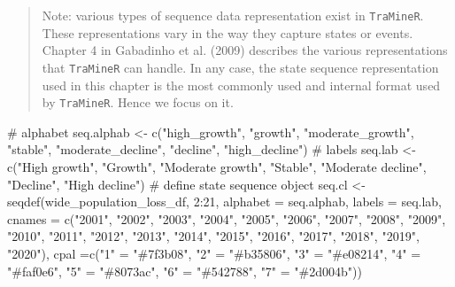 \documentclass[
  letterpaper,
  DIV=11,
  numbers=noendperiod]{scrreprt}
\newenvironment{Shaded}{\begin{snugshade}}{\end{snugshade}}
\newcommand{\AttributeTok}[1]{\textcolor[rgb]{0.40,0.45,0.13}{#1}}
\newcommand{\CommentTok}[1]{\textcolor[rgb]{0.37,0.37,0.37}{#1}}
\newcommand{\DecValTok}[1]{\textcolor[rgb]{0.68,0.00,0.00}{#1}}
\newcommand{\FunctionTok}[1]{\textcolor[rgb]{0.28,0.35,0.67}{#1}}
\newcommand{\NormalTok}[1]{\textcolor[rgb]{0.00,0.23,0.31}{#1}}
\newcommand{\OtherTok}[1]{\textcolor[rgb]{0.00,0.23,0.31}{#1}}
\newcommand{\SpecialCharTok}[1]{\textcolor[rgb]{0.37,0.37,0.37}{#1}}
\newcommand{\StringTok}[1]{\textcolor[rgb]{0.13,0.47,0.30}{#1}}
\begin{document}
\begin{quote}
Note: various types of sequence data representation exist in
\texttt{TraMineR}. These representations vary in the way they capture
states or events. Chapter 4 in Gabadinho et al. (2009) describes the
various representations that \texttt{TraMineR} can handle. In any case,
the state sequence representation used in this chapter is the most
commonly used and internal format used by \texttt{TraMineR}. Hence we
focus on it.
\end{quote}

\begin{Shaded}
\begin{Highlighting}[]
\CommentTok{\# alphabet}
\NormalTok{seq.alphab }\OtherTok{\textless{}{-}} \FunctionTok{c}\NormalTok{(}\StringTok{"high\_growth"}\NormalTok{, }\StringTok{"growth"}\NormalTok{, }\StringTok{"moderate\_growth"}\NormalTok{, }\StringTok{"stable"}\NormalTok{, }\StringTok{"moderate\_decline"}\NormalTok{, }\StringTok{"decline"}\NormalTok{, }\StringTok{"high\_decline"}\NormalTok{)}
\CommentTok{\# labels}
\NormalTok{seq.lab }\OtherTok{\textless{}{-}} \FunctionTok{c}\NormalTok{(}\StringTok{"High growth"}\NormalTok{, }\StringTok{"Growth"}\NormalTok{, }\StringTok{"Moderate growth"}\NormalTok{, }\StringTok{"Stable"}\NormalTok{, }\StringTok{"Moderate decline"}\NormalTok{, }\StringTok{"Decline"}\NormalTok{, }\StringTok{"High decline"}\NormalTok{)}
\CommentTok{\# define state sequence object}
\NormalTok{seq.cl }\OtherTok{\textless{}{-}} \FunctionTok{seqdef}\NormalTok{(wide\_population\_loss\_df, }
                 \DecValTok{2}\SpecialCharTok{:}\DecValTok{21}\NormalTok{, }
                 \AttributeTok{alphabet =}\NormalTok{ seq.alphab,}
                 \AttributeTok{labels =}\NormalTok{ seq.lab,}
                 \AttributeTok{cnames =} \FunctionTok{c}\NormalTok{(}\StringTok{"2001"}\NormalTok{, }\StringTok{"2002"}\NormalTok{, }\StringTok{"2003"}\NormalTok{, }\StringTok{"2004"}\NormalTok{, }\StringTok{"2005"}\NormalTok{, }\StringTok{"2006"}\NormalTok{, }\StringTok{"2007"}\NormalTok{, }\StringTok{"2008"}\NormalTok{, }\StringTok{"2009"}\NormalTok{, }\StringTok{"2010"}\NormalTok{, }\StringTok{"2011"}\NormalTok{, }\StringTok{"2012"}\NormalTok{, }\StringTok{"2013"}\NormalTok{, }\StringTok{"2014"}\NormalTok{, }\StringTok{"2015"}\NormalTok{, }\StringTok{"2016"}\NormalTok{, }\StringTok{"2017"}\NormalTok{, }\StringTok{"2018"}\NormalTok{, }\StringTok{"2019"}\NormalTok{, }\StringTok{"2020"}\NormalTok{),}
                 \AttributeTok{cpal =}\FunctionTok{c}\NormalTok{(}\StringTok{"1"} \OtherTok{=} \StringTok{"\#7f3b08"}\NormalTok{, }
                         \StringTok{"2"} \OtherTok{=} \StringTok{"\#b35806"}\NormalTok{,}
                         \StringTok{"3"} \OtherTok{=} \StringTok{"\#e08214"}\NormalTok{,}
                         \StringTok{"4"} \OtherTok{=} \StringTok{"\#faf0e6"}\NormalTok{,}
                         \StringTok{"5"} \OtherTok{=} \StringTok{"\#8073ac"}\NormalTok{,}
                         \StringTok{"6"} \OtherTok{=} \StringTok{"\#542788"}\NormalTok{,}
                         \StringTok{"7"} \OtherTok{=} \StringTok{"\#2d004b"}\NormalTok{))}
\end{Highlighting}
\end{Shaded}
\end{document}
